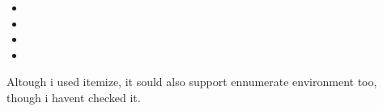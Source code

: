 \begin{refsection}
\blindtext[1]

\begin{itemize}
	\item[a.] \blindtext[1]
	\item[b.] \blindtext[1]
	\item[c.] \blindtext[1]
	\item[d.] \blindtext[1]
\end{itemize}

Altough i used itemize, it sould also support ennumerate environment too, though i havent checked it.

\nocite{example-3,example-4}

\printbibliography[heading=misubseccion]
\end{refsection}

\newpage
{}



